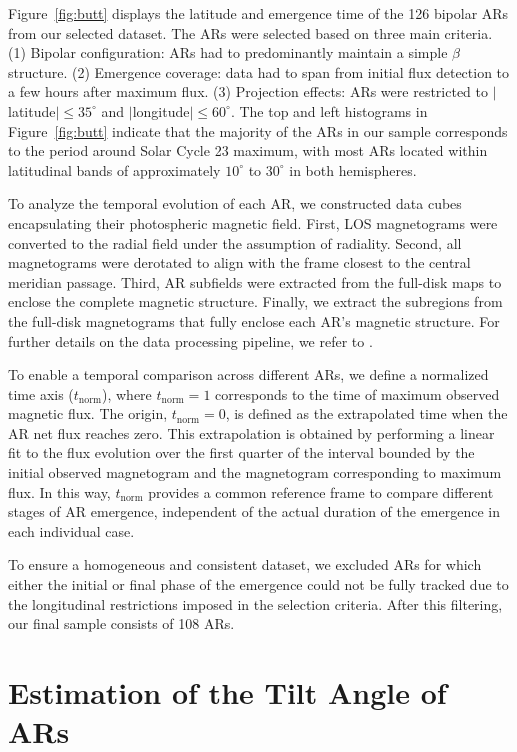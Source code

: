 \documentclass[namedreferences,hyperref,optionalrh]{spr-sola}
\begin{document}
Figure~\ref{fig:butt} displays the latitude and emergence time of the 126 bipolar ARs from our selected dataset. The ARs were selected based on three main criteria.  
(1) Bipolar configuration: ARs had to predominantly maintain a simple $\beta$ structure.
(2) Emergence coverage: data had to span from initial flux detection to a few hours after maximum flux.
(3) Projection effects: ARs were restricted to $|$latitude$| \leq 35^\circ$ and $|$longitude$| \leq 60^\circ$.
  The top and left histograms in Figure~\ref{fig:butt} indicate that the majority of the ARs in our sample corresponds to the period around Solar Cycle 23 maximum, with most ARs located within latitudinal bands of approximately $10^\circ$ to $30^\circ$ in both hemispheres.

To analyze the temporal evolution of each AR, we constructed data cubes encapsulating their photospheric magnetic field. First, LOS magnetograms were converted to the radial field under the assumption of radiality. Second, all magnetograms were derotated to align with the frame closest to the central meridian passage. Third, AR subfields were extracted from the full-disk maps to enclose the complete magnetic structure. Finally, we extract the subregions from the full-disk magnetograms that fully enclose each AR’s magnetic structure. For further details on the data processing pipeline, we refer to \citet{Poisson22, Poisson24}.

To enable a temporal comparison across different ARs, we define a normalized time axis ($t_{\mathrm{norm}}$), where $t_{\mathrm{norm}} = 1$ corresponds to the time of maximum observed magnetic flux. The origin, $t_{\mathrm{norm}} = 0$, is defined as the extrapolated time when the AR net flux reaches zero. This extrapolation is obtained by performing a linear fit to the flux evolution over the first quarter of the interval bounded by the initial observed magnetogram and the magnetogram corresponding to maximum flux. In this way, $t_{\mathrm{norm}}$ provides a common reference frame to compare different stages of AR emergence, independent of the actual duration of the emergence in each individual case.

To ensure a homogeneous and consistent dataset, we excluded ARs for which either the initial or final phase of the emergence could not be fully tracked due to the longitudinal restrictions imposed in the selection criteria. After this filtering, our final sample consists of 108 ARs.

 \section{Estimation of the Tilt Angle of ARs}
      \label{S-method}
\end{document}
